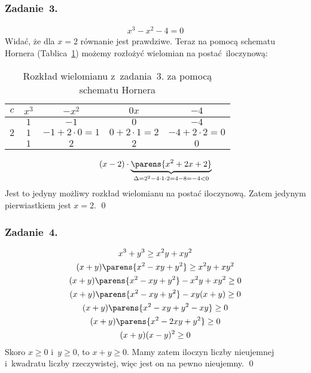 \subsubsection*{Zadanie~3.}
\begin{gather*}
    x^3 - x^2 - 4 = 0
\end{gather*}
Widać, że dla \(x = 2\) równanie jest prawdziwe. Teraz na pomocą schematu Hornera (Tablica~\ref{2020_09_28:3:table:horner}) możemy rozłożyć wielomian na postać iloczynową:
\begin{table}[H]
    \centering
    \begin{tabular}{c|c|c|c|c}
        \(c\) & \(x^3\) & \(-x^2\) & \(0x\) & \(-4\)\\
        \hline
        & \(1\) & \(-1\) & \(0\) & \(-4\)\\
        \hline
        \(2\) & \(1\) & \(-1 + 2 \cdot 0 = 1\) & \(0 + 2 \cdot 1 = 2\) & \(-4 + 2 \cdot 2 = 0\)\\
        \hline
        & \(1\) & \(2\) & \(2\) & \(0\)
    \end{tabular}
    \caption{Rozkład wielomianu z~zadania~3. za pomocą schematu Hornera}
    \label{2020_09_28:3:table:horner}
\end{table}
\begin{equation*}
    (x - 2) \cdot \underbrace{\parens{x^2 + 2x + 2}}_{\Delta = 2^2 - 4 \cdot 1 \cdot 2 = 4 - 8 = -4 < 0}
\end{equation*}
Jest to jedyny możliwy rozkład wielomianu na postać iloczynową. Zatem jedynym pierwiastkiem jest \(x = 2\).
\qed
\subsubsection*{Zadanie~4.}
\begin{gather*}
    x^3 + y^3 \geq x^2y + xy^2\\
    (x + y)\parens{x^2 - xy + y^2} \geq x^2y + xy^2\\
    (x + y)\parens{x^2 - xy + y^2} - x^2y + xy^2 \geq 0\\
    (x + y)\parens{x^2 - xy + y^2} - xy(x + y) \geq 0\\
    (x + y)\parens{x^2 - xy + y^2 - xy} \geq 0\\
    (x + y)\parens{x^2 - 2xy + y^2} \geq 0\\
    (x + y)(x - y)^2 \geq 0
\end{gather*}
Skoro \(x \geq 0\) i~\(y \geq 0\), to \(x + y \geq 0\). Mamy zatem iloczyn liczby nieujemnej i~kwadratu liczby rzeczywistej, więc jest on na pewno nieujemny.
\qed
